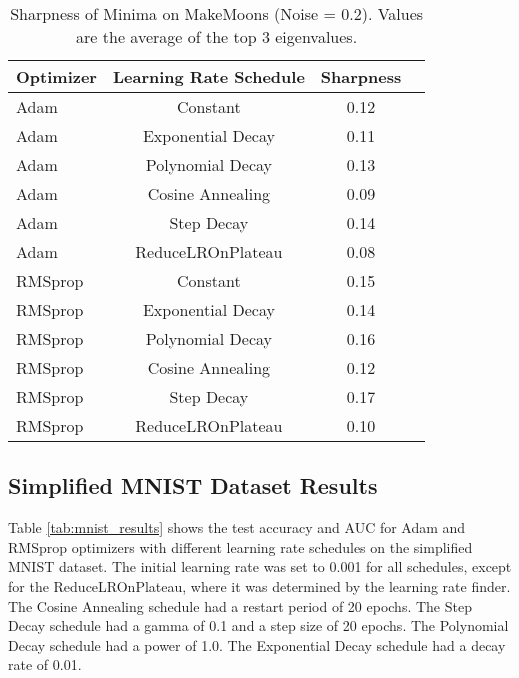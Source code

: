 \documentclass[conference]{IEEEtran}
\begin{document}
\begin{table}[htbp]
\centering
\caption{Sharpness of Minima on MakeMoons (Noise = 0.2).  Values are the average of the top 3 eigenvalues.}
\label{tab:makemoons_sharpness}
\begin{tabular}{@{}lccc@{}}
\toprule
Optimizer & Learning Rate Schedule & Sharpness \\ \midrule
Adam      & Constant              & 0.12          \\
Adam      & Exponential Decay     & 0.11          \\
Adam      & Polynomial Decay      & 0.13          \\
Adam      & Cosine Annealing      & 0.09        \\
Adam      & Step Decay            & 0.14     \\
Adam      & ReduceLROnPlateau     & 0.08       \\
RMSprop   & Constant              & 0.15         \\
RMSprop   & Exponential Decay     & 0.14          \\
RMSprop   & Polynomial Decay      & 0.16          \\
RMSprop   & Cosine Annealing      & 0.12        \\
RMSprop   & Step Decay            & 0.17          \\
RMSprop   & ReduceLROnPlateau     & 0.10        \\ \bottomrule
\end{tabular}
\end{table}

\subsection{Simplified MNIST Dataset Results}

Table \ref{tab:mnist_results} shows the test accuracy and AUC for Adam and RMSprop optimizers with different learning rate schedules on the simplified MNIST dataset.  The initial learning rate was set to 0.001 for all schedules, except for the ReduceLROnPlateau, where it was determined by the learning rate finder.  The Cosine Annealing schedule had a restart period of 20 epochs.  The Step Decay schedule had a gamma of 0.1 and a step size of 20 epochs. The Polynomial Decay schedule had a power of 1.0.  The Exponential Decay schedule had a decay rate of 0.01.
\end{document}

